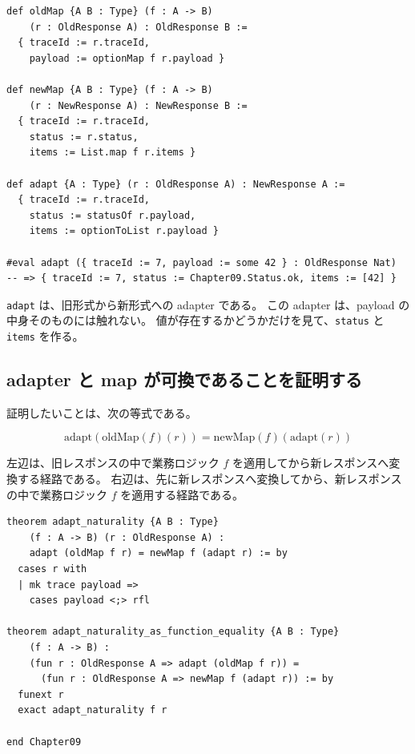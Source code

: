 \begin{listing}[htbp]
\begin{verbatim}
def oldMap {A B : Type} (f : A -> B)
    (r : OldResponse A) : OldResponse B :=
  { traceId := r.traceId,
    payload := optionMap f r.payload }

def newMap {A B : Type} (f : A -> B)
    (r : NewResponse A) : NewResponse B :=
  { traceId := r.traceId,
    status := r.status,
    items := List.map f r.items }

def adapt {A : Type} (r : OldResponse A) : NewResponse A :=
  { traceId := r.traceId,
    status := statusOf r.payload,
    items := optionToList r.payload }

#eval adapt ({ traceId := 7, payload := some 42 } : OldResponse Nat)  -- => { traceId := 7, status := Chapter09.Status.ok, items := [42] }
\end{verbatim}
\caption{レスポンスwrapperのmapとadapter}
\label{lst:ch09_api_map_adapt}
\end{listing}

\texttt{adapt} は、旧形式から新形式への adapter である。
この adapter は、payload の中身そのものには触れない。
値が存在するかどうかだけを見て、\texttt{status} と \texttt{items} を作る。

\subsection{adapter と map が可換であることを証明する}

証明したいことは、次の等式である。

\[
  \mathrm{adapt}(\mathrm{oldMap}(f)(r))
  =
  \mathrm{newMap}(f)(\mathrm{adapt}(r))
\]

左辺は、旧レスポンスの中で業務ロジック \(f\) を適用してから新レスポンスへ変換する経路である。
右辺は、先に新レスポンスへ変換してから、新レスポンスの中で業務ロジック \(f\) を適用する経路である。

\begin{listing}[htbp]
\begin{verbatim}
theorem adapt_naturality {A B : Type}
    (f : A -> B) (r : OldResponse A) :
    adapt (oldMap f r) = newMap f (adapt r) := by
  cases r with
  | mk trace payload =>
    cases payload <;> rfl

theorem adapt_naturality_as_function_equality {A B : Type}
    (f : A -> B) :
    (fun r : OldResponse A => adapt (oldMap f r)) =
      (fun r : OldResponse A => newMap f (adapt r)) := by
  funext r
  exact adapt_naturality f r

end Chapter09
\end{verbatim}
\caption{API adapter の自然性}
\label{lst:ch09_api_naturality}
\end{listing}


